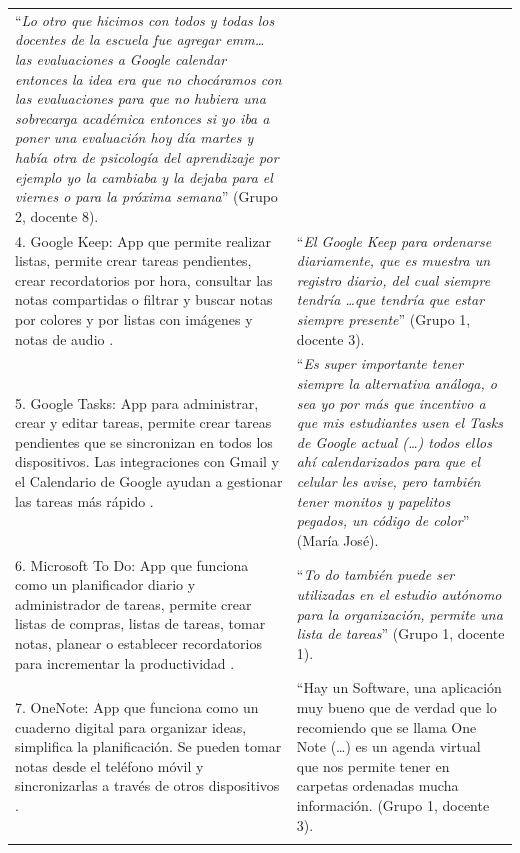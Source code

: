 \documentclass[spanish]{textolivre}
\begin{document}
\begin{longtable}{p{}p{}}
“\emph{Lo otro que hicimos con todos y todas los docentes de la escuela fue agregar emm… las evaluaciones a Google calendar entonces la idea era que no chocáramos con las evaluaciones para que no hubiera una sobrecarga académica entonces si yo iba a poner una evaluación hoy día martes y había otra de psicología del aprendizaje por ejemplo yo la cambiaba y la dejaba para el viernes o para la próxima semana}” (Grupo 2, docente 8).
\\
4. Google Keep: App que permite realizar listas, permite crear tareas pendientes, crear recordatorios por hora, consultar las notas compartidas o filtrar y buscar notas por colores y por listas con imágenes y notas de audio \cite{google2021b}. &
“\emph{El Google Keep para ordenarse diariamente, que es muestra un registro diario, del cual siempre tendría …que tendría que estar siempre presente}” (Grupo 1, docente 3).
\\
5. Google Tasks: App para administrar, crear y editar tareas, permite crear tareas pendientes que se sincronizan en todos los dispositivos. Las integraciones con Gmail y el Calendario de Google ayudan a gestionar las tareas más rápido \cite{google2021c}. &
“\emph{Es super importante tener siempre la alternativa análoga, o sea yo por más que incentivo a que mis estudiantes usen el Tasks de Google  actual (…) todos ellos ahí calendarizados para que el celular les avise, pero también tener monitos y papelitos pegados, un código de color}” (María José).
\\
6. Microsoft To Do: App que funciona como un planificador diario y administrador de tareas, permite crear listas de compras, listas de tareas, tomar notas, planear o establecer recordatorios para incrementar la productividad \cite{one_microsoft_way_microsoft_2021}. &
“\emph{To do también  puede ser utilizadas en el estudio autónomo para la organización, permite una lista de tareas}” (Grupo 1, docente 1).
\\
7. OneNote: App que funciona como un cuaderno digital para organizar ideas, simplifica la planificación. Se pueden tomar notas desde el teléfono móvil y sincronizarlas a través de otros dispositivos \cite{microsoft2021a}. &
“Hay un Software, una aplicación muy bueno que de verdad que lo recomiendo que se llama One Note (…) es un agenda virtual que nos permite tener en carpetas ordenadas mucha información. (Grupo 1, docente 3).
\\
\vspace{8em} \\
\midrule

\end{longtable}
\end{document}
